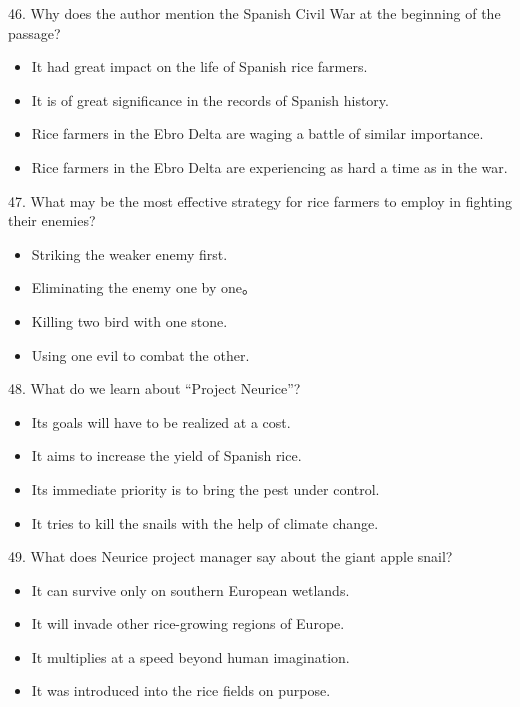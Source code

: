 \documentclass[UTF8,11pt]{ctexart}
\begin{document}
46. Why does the author mention the Spanish Civil War at the beginning of the passage?


\begin{itemize}[leftmargin=2em,itemsep=.2em,topsep=.4em]\item[A.] It had great impact on the life of Spanish rice farmers.
\item[B.] It is of great significance in the records of Spanish history.
\item[C.] Rice farmers in the Ebro Delta are waging a battle of similar importance.
\item[D.] Rice farmers in the Ebro Delta are experiencing as hard a time as in the war.
\end{itemize}

47. What may be the most effective strategy for rice farmers to employ in fighting their enemies?


\begin{itemize}[leftmargin=2em,itemsep=.2em,topsep=.4em]\item[A.] Striking the weaker enemy first.
\item[B.] Eliminating the enemy one by one。
\item[C.] Killing two bird with one stone.
\item[D.] Using one evil to combat the other.
\end{itemize}

48. What do we learn about “Project Neurice”?


\begin{itemize}[leftmargin=2em,itemsep=.2em,topsep=.4em]\item[A.] Its goals will have to be realized at a cost.
\item[B.] It aims to increase the yield of Spanish rice.
\item[C.] Its immediate priority is to bring the pest under control.
\item[D.] It tries to kill the snails with the help of climate change.
\end{itemize}

49. What does Neurice project manager say about the giant apple snail?


\begin{itemize}[leftmargin=2em,itemsep=.2em,topsep=.4em]\item[A.] It can survive only on southern European wetlands.
\item[B.] It will invade other rice-growing regions of Europe.
\item[C.] It multiplies at a speed beyond human imagination.
\item[D.] It was introduced into the rice fields on purpose.
\end{itemize}
\end{document}
